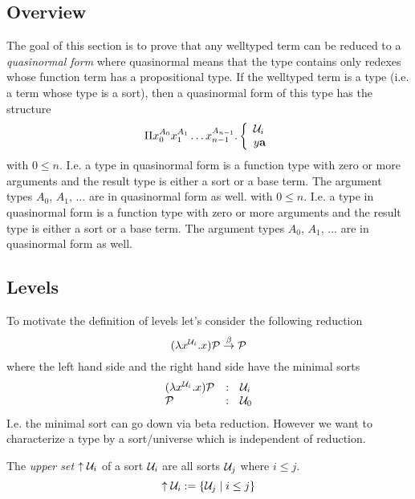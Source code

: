 \subsection{Overview}

The goal of this section is to prove that any welltyped term can be reduced to a
\emph{quasinormal form} where quasinormal means that the type contains only
redexes whose function term has a propositional type. If the welltyped term is a
type (i.e. a term whose type is a sort), then a quasinormal form of this type
has the structure
$$
    \Pi
    x_0^{A_0} x_1^{A_1} \ldots x_{n-1}^{A_{n-1}}
    .
    \left\{
        \begin{array}{l}
            {\cal U}_i
            \\
            y {\mathbf a}
        \end{array}
    \right .
$$
with $0 \le n$. I.e. a type in quasinormal form is a function type with zero or
more arguments and the result type is either a sort or a base term. The argument
types $A_0$, $A_1$, $\ldots$ are in quasinormal form as well.
with $0 \le n$. I.e. a type in quasinormal form is a function type with zero or
more arguments and the result type is either a sort or a base term. The argument
types $A_0$, $A_1$, $\ldots$ are in quasinormal form as well.






\subsection{Levels}

To motivate the definition of levels let's consider the following reduction
$$
    (\lambda x^{{\cal U}_i}. x) {\cal P} \stackrel{\beta}{\to} {\cal P}
$$
where the left hand side and the right hand side have the minimal sorts
$$
    \begin{array}{lll}
        (\lambda x^{{\cal U}_i} . x) {\cal P} &:& {\cal U}_i
        \\
        {\cal P} &:& {\cal U}_0
    \end{array}
$$
I.e. the minimal sort can go down via beta reduction. However we want to
characterize a type by a sort/universe which is independent of reduction.




\begin{definition}
    \label{def:UpperSet}
    The \emph{upper set} ${\uparrow {\cal U}_i}$ of a sort ${\cal U}_i$ are all sorts
    ${\cal U}_j$ where $i \le j$.
    $$
    {\uparrow {\cal U}_i} := {\left\{{\cal U}_j \mid i \le j\right\}}
    $$
\end{definition}




